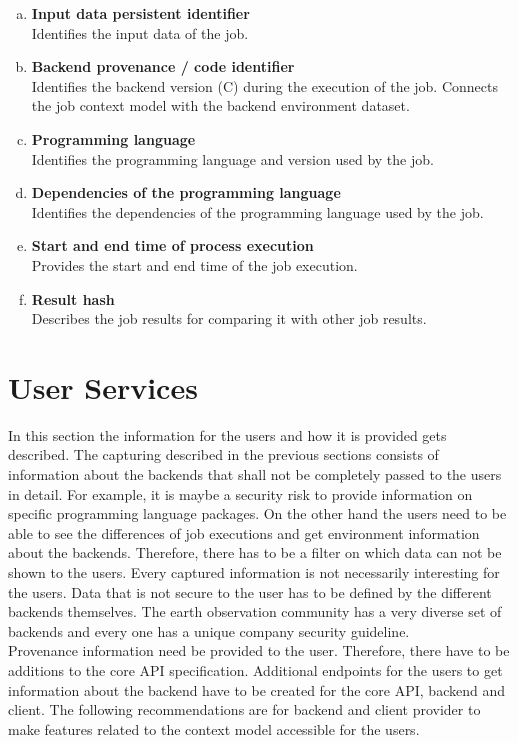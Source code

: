 \documentclass[draft,final]{vutinfth} %
\begin{document}
\begin{enumerate}[(a)]
	\item \textbf{Input data persistent identifier} \\
	Identifies the input data of the job.
	\item \textbf{Backend provenance / code identifier} \\
	Identifies the backend version (C) during the execution of the job. Connects the job context model with the backend environment dataset.
	\item \textbf{Programming language} \\
	Identifies the programming language and version used by the job.
	\item \textbf{Dependencies of the programming language} \\
	Identifies the dependencies of the programming language used by the job.
	\item \textbf{Start and end time of process execution} \\
	Provides the start and end time of the job execution.
	\item \textbf{Result hash} \\
	Describes the job results for comparing it with other job results.
\end{enumerate}

\section{User Services}\label{Design:User Interface}

In this section the information for the users and how it is provided gets described. The capturing described in the previous sections consists of information about the backends that shall not be completely passed to the users in detail. For example, it is maybe a security risk to provide information on specific programming language packages. On the other hand the users need to be able to see the differences of job executions and get environment information about the backends. Therefore, there has to be a filter on which data can not be shown to the users. Every captured information is not necessarily interesting for the users. Data that is not secure to the user has to be defined by the different backends themselves. The earth observation community has a very diverse set of backends and every one has a unique company security guideline.\\ 
Provenance information need be provided to the user. Therefore, there have to be additions to the core API specification. Additional endpoints for the users to get information about the backend have to be created for the core API, backend and client. The following recommendations are for backend and client provider to make features related to the context model accessible for the users.
\end{document}
